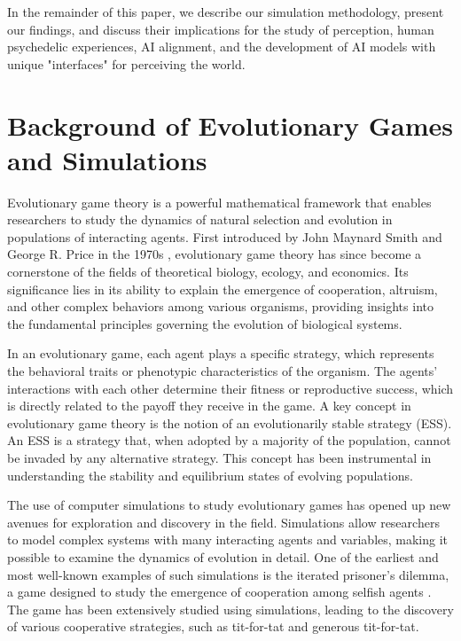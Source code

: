 \documentclass{article}[10pt]
\begin{document}
In the remainder of this paper, we describe our simulation methodology, present our findings, and discuss their implications for the study of perception, human psychedelic experiences, AI alignment, and the development of AI models with unique "interfaces" for perceiving the world.

\section{Background of Evolutionary Games and Simulations}

Evolutionary game theory is a powerful mathematical framework that enables researchers to study the dynamics of natural selection and evolution in populations of interacting agents. First introduced by John Maynard Smith and George R. Price in the 1970s \cite{smith1973logic}, evolutionary game theory has since become a cornerstone of the fields of theoretical biology, ecology, and economics. Its significance lies in its ability to explain the emergence of cooperation, altruism, and other complex behaviors among various organisms, providing insights into the fundamental principles governing the evolution of biological systems.

In an evolutionary game, each agent plays a specific strategy, which represents the behavioral traits or phenotypic characteristics of the organism. The agents' interactions with each other determine their fitness or reproductive success, which is directly related to the payoff they receive in the game. A key concept in evolutionary game theory is the notion of an evolutionarily stable strategy (ESS). An ESS is a strategy that, when adopted by a majority of the population, cannot be invaded by any alternative strategy. This concept has been instrumental in understanding the stability and equilibrium states of evolving populations.

The use of computer simulations to study evolutionary games has opened up new avenues for exploration and discovery in the field. Simulations allow researchers to model complex systems with many interacting agents and variables, making it possible to examine the dynamics of evolution in detail. One of the earliest and most well-known examples of such simulations is the iterated prisoner's dilemma, a game designed to study the emergence of cooperation among selfish agents \cite{axelrod1984evolution}. The game has been extensively studied using simulations, leading to the discovery of various cooperative strategies, such as tit-for-tat and generous tit-for-tat.
\end{document}
